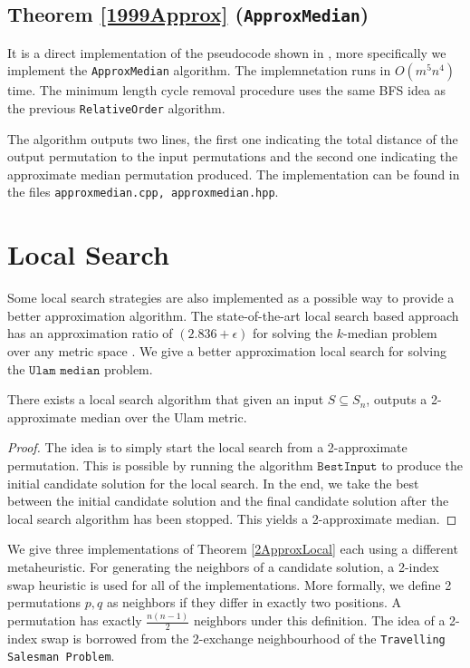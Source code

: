 \subsection{Theorem \ref{1999Approx} (\texttt{ApproxMedian})}
It is a direct implementation of the pseudocode shown in \cite{ClusteringPermutation}, more specifically we implement the \texttt{ApproxMedian} algorithm. The implemnetation runs in $O(m^5 n^4)$ time. The minimum length cycle removal procedure uses the same BFS idea as the previous \texttt{RelativeOrder} algorithm.

The algorithm outputs two lines, the first one indicating the total distance of the output permutation to the input permutations and the second one indicating the approximate median permutation produced. The implementation can be found in the files \texttt{approx\textunderscore median.cpp, approx\textunderscore median.hpp}.

\section{Local Search}
Some local search strategies are also implemented as a possible way to provide a better approximation algorithm. The state-of-the-art local search based approach has an approximation ratio of $(2.836 + \epsilon)$ for solving the $k$-median problem over any metric space \cite{LocalSearch}. We give a better approximation local search for solving the $\texttt{Ulam median}$ problem.

\begin{theorem}
\label{2ApproxLocal}
    There exists a local search algorithm that given an input $S \subseteq S_n$, outputs a 2-approximate median over the Ulam metric.
\end{theorem}

\begin{proof}
    The idea is to simply start the local search from a 2-approximate permutation. This is possible by running the algorithm $\texttt{BestInput}$ to produce the initial candidate solution for the local search. In the end, we take the best between the initial candidate solution and the final candidate solution after the local search algorithm has been stopped. This yields a 2-approximate median.
\end{proof}

We give three implementations of Theorem \ref{2ApproxLocal} each using a different metaheuristic. For generating the neighbors of a candidate solution, a 2-index swap heuristic is used for all of the implementations. More formally, we define 2 permutations $p, q$ as neighbors if they differ in exactly two positions. A permutation has exactly $\frac{n(n - 1)}{2}$ neighbors under this definition. The idea of a 2-index swap is borrowed from the 2-exchange neighbourhood of the \texttt{Travelling Salesman Problem}.

